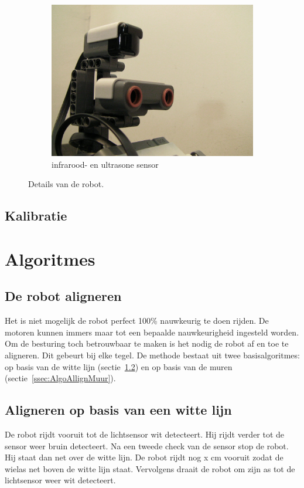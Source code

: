 \documentclass[tt3]{penoverslag}
\begin{document}
\begin{figure}
\begin{subfigure}[h]{0.325\textwidth}
		\includegraphics[width=\textwidth]{robotSensoren}
		\caption{infrarood- en ultrasone sensor}
	\end{subfigure}
\caption{Details van de robot.}
\label{fig:robotDetail}
\end{figure}

\subsection{Kalibratie}
\label{ssec:Kalib}


\section{Algoritmes}
\label{sec:Algo}

\subsection{De robot aligneren}
\label{ssec:AlgoAllign}
Het is niet mogelijk de robot perfect 100\% nauwkeurig te doen rijden. De motoren kunnen immers maar tot een bepaalde nauwkeurigheid ingesteld worden. Om de besturing toch betrouwbaar te maken is het nodig de robot af en toe te aligneren. Dit gebeurt bij elke tegel. %
De methode bestaat uit twee basisalgoritmes: op basis van de witte lijn (sectie~\ref{ssec:AlgoAllignWit}) en op basis van de muren (sectie~\ref{ssec:AlgoAllignMuur}).

\subsection{Aligneren op basis van een witte lijn}
\label{ssec:AlgoAllignWit}
De robot rijdt vooruit tot de lichtsensor wit detecteert. Hij rijdt verder tot de sensor weer bruin detecteert. Na een tweede check van de sensor stop de robot. Hij staat dan net over de witte lijn. De robot rijdt nog x cm vooruit zodat de wielas net boven de witte lijn staat.
Vervolgens draait de robot om zijn as tot de lichtsensor weer wit detecteert.
\end{document}
